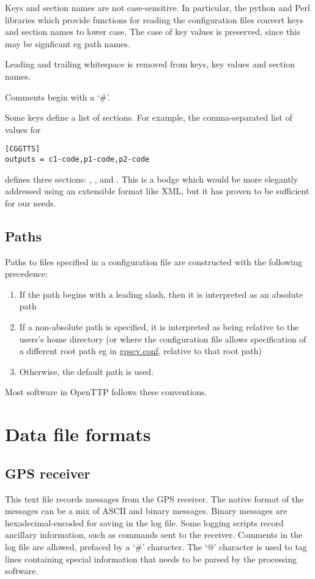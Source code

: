 Keys and section names are not case-sensitive. In particular, the python and Perl libraries
which provide functions for reading the configuration files convert keys and section names to lower case.
The case of key values is preserved, since this may be signficant eg path names.

Leading and trailing whitespace is removed from keys, key values and section names.

Comments begin with a `\#'. 

Some keys define a list of sections. 
For example, the comma-separated list of values for  
\begin{lstlisting}
[CGGTTS]
outputs = c1-code,p1-code,p2-code
\end{lstlisting}
defines three sections: , , and .
This is a bodge which would be more elegantly addressed using an extensible format like XML, 
but it has proven to be sufficient for our needs.

\subsection{Paths} \label{s:ConfigFilePaths}

Paths to files  specified in a configuration file are constructed with the following 
precedence:
\begin{enumerate}
\item If the path begins with a leading slash, then it is interpreted as an absolute path
\item If a non-absolute path is specified, it is interpreted as being relative to 
	the users's home directory (or where the configuration file allows specification of a different root path eg in \hyperlink{h:rootpath}{gpscv.conf}, relative to that root path) 
\item Otherwise, the default path is used.
\end{enumerate}
Most software in OpenTTP follows these conventions.

\section{Data file formats \label{s:DataFileFormat}}

\subsection{GPS receiver}

This text file records messages from the GPS receiver. 
The native format of the messages can be a mix of ASCII and binary messages.
Binary messages are hexadecimal-encoded for saving in the log file. 
Some logging scripts record ancillary information, such as commands sent to the receiver. 
Comments in the log file are allowed, prefaced by a `\#' character. 
The `@' character is used to tag lines containing special information that needs to be parsed by
the processing software.

